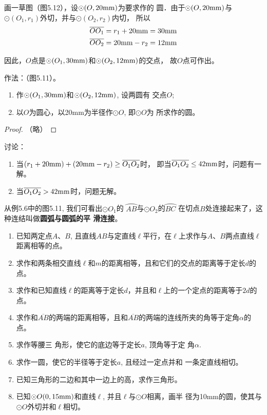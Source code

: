 \begin{analyze}
    画一草图（图5.12），设$\odot (O,20{\rm mm})$为要求作的
圆．由于$\odot (O,20{\rm mm})$与$\odot (O_1,r_1)$外切，并与$\odot (O_2,r_2)$内切，
所以
\[\begin{split}
   \overline{OO_1}&=r_1+20{\rm  mm}=30{\rm mm}\\
   \overline{OO_2}&=20{\rm  mm}-r_2=12{\rm  mm} 
\end{split}\]

因此，$O$点是$\odot (O_1,30{\rm mm})$和$\odot (O_2,12{\rm  mm})$的交点，
故$O$点可作出。
\end{analyze}

作法：（图5.11）。
\begin{enumerate}
    \item 作$\odot (O_1,30{\rm mm})$和$\odot (O_2,12{\rm mm})$, 设两圆有
交点$O$;
\item 以$O$为圆心，以20mm为半径作$\odot O$, 即$\odot O$为
所求作的圆。
\end{enumerate}

\begin{proof}
（略）
\end{proof}

讨论：
\begin{enumerate}
    \item 当$(r_1+20{\rm mm})+(20{\rm mm}-r_2)\ge \overline{O_1O_2}$时，
即当$ \overline{O_1O_2}\le 42{\rm mm}$时，问题有一解。
\item 当$ \overline{O_1O_2}> 42{\rm mm}$时，问题无解。
\end{enumerate}

从例5.6中的图5.11, 我们可看出$\odot O_1$的
$\wideparen{AB}$与$\odot O_2$的$\wideparen{BC}$
在切点$B$处连接起来了，这种连结叫做\textbf{圆弧与圆弧的平
滑连接}。

\begin{ex}
\begin{enumerate}
    \item 已知两定点$A$、$B$, 且直线$AB$与定直线$\ell$平行，在$\ell$上求作与$A$、$B$两点直线$\ell$距离相等的点。
    \item 求作和两条相交直线$\ell$和$m$的距离相等，且和它们的交点的距离等于定长$d$的点。
    \item 求作和已知直线$\ell$的距离等于定长$d$，并且和$\ell$上的一个定点的距离等于$2d$的点。
    \item 求作和$\overline{AB}$的两端的距离相等，且和$\overline{AB}$的两端的连线所夹的角等于定角$\alpha$的点。
    \item 求作等腰三
    角形，使它的底边等于定长$a$, 顶角等于定
    角$\alpha$.
    \item 求作一圆，使它的半径等于定长$a$, 且经过一定点并和
    一条定直线相切。
    \item 已知三角形的二边和其中一边上的高，求作三角形。
    \item 已知$\odot O(0,15{\rm mm})$和直线$\ell$, 并且$\ell$与$\odot O$相离，画半
    径为10mm的圆，使其与$\odot O$外切并和$\ell$相切。
\end{enumerate}
\end{ex}

